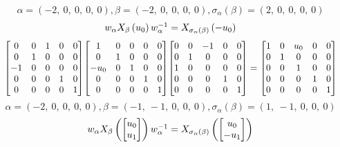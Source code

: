 \documentclass[11pt]{article}
\theoremstyle{definition}
\begin{document}
\providecommand{\scaletoalign}[2]{%
  \sbox0{$#2$}%
  \ifdim\wd0>#1\relax 
    \resizebox{#1}{!}{\usebox0}%
  \else 
    \usebox0%
  \fi 
}
\[
\alpha = \left( -2, \  0, \  0, \  0, \  0\right), \beta = \left( -2, \  0, \  0, \  0, \  0\right), \sigma_{\alpha}(\beta) = \left( 2, \  0, \  0, \  0, \  0\right)
\]
\[
\scaletoalign{\textwidth}{w_{\alpha} X_{\beta}\left(u_{0}\right) w_{\alpha}^{-1} = X_{\sigma_{\alpha}\left(\beta\right)}\left(- u_{0}\right)}
\]
\[
\scaletoalign{\textwidth}{{\left[\begin{matrix}0 & 0 & 1 & 0 & 0\\0 & 1 & 0 & 0 & 0\\-1 & 0 & 0 & 0 & 0\\0 & 0 & 0 & 1 & 0\\0 & 0 & 0 & 0 & 1\end{matrix}\right]} {\left[\begin{matrix}1 & 0 & 0 & 0 & 0\\0 & 1 & 0 & 0 & 0\\- u_{0} & 0 & 1 & 0 & 0\\0 & 0 & 0 & 1 & 0\\0 & 0 & 0 & 0 & 1\end{matrix}\right]} {\left[\begin{matrix}0 & 0 & -1 & 0 & 0\\0 & 1 & 0 & 0 & 0\\1 & 0 & 0 & 0 & 0\\0 & 0 & 0 & 1 & 0\\0 & 0 & 0 & 0 & 1\end{matrix}\right]} = {\left[\begin{matrix}1 & 0 & u_{0} & 0 & 0\\0 & 1 & 0 & 0 & 0\\0 & 0 & 1 & 0 & 0\\0 & 0 & 0 & 1 & 0\\0 & 0 & 0 & 0 & 1\end{matrix}\right]}}
\]
\[
\alpha = \left( -2, \  0, \  0, \  0, \  0\right), \beta = \left( -1, \  -1, \  0, \  0, \  0\right), \sigma_{\alpha}(\beta) = \left( 1, \  -1, \  0, \  0, \  0\right)
\]
\[
\scaletoalign{\textwidth}{w_{\alpha} X_{\beta}\left(\left[\begin{matrix}u_{0}\\u_{1}\end{matrix}\right]\right) w_{\alpha}^{-1} = X_{\sigma_{\alpha}\left(\beta\right)}\left(\left[\begin{matrix}u_{0}\\- u_{1}\end{matrix}\right]\right)}
\]
\end{document}
